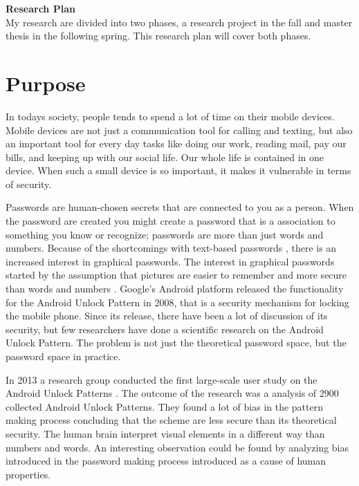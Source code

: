 
{\bf \Huge Research Plan} \\[0.5cm]

  My research are divided into two phases, a research project in the fall and master thesis in the following spring. This research plan will cover both phases.

  \section*{Purpose}


  In todays society, people tends to spend a lot of time on their mobile devices. Mobile devices are not just a communication tool for calling and texting, but also an important tool for every day tasks like doing our work, reading mail, pay our bills, and keeping up with our social life. Our whole life is contained in one device. When such a small device is so important, it makes it vulnerable in terms of security.

  Passwords are human-chosen secrets that are connected to you as a person. When the password are created you might create a password that is a association to something you know or recognize; passwords are more than just words and numbers. Because of the shortcomings with text-based passwords \cite{UnixPasswords}, there is an increased interest in graphical passwords. The interest in graphical passwords started by the assumption that pictures are easier to remember and more secure than words and numbers \cite{DeAngeli}. Google's Android platform released the functionality for the Android Unlock Pattern in 2008, that is a security mechanism for locking the mobile phone. Since its release, there have been a lot of discussion of its security, but few researchers have done a scientific research on the Android Unlock Pattern. The problem is not just the theoretical password space, but the password space in practice. 

  In 2013 a research group conducted the first large-scale user study on the Android Unlock Patterns \cite{Uellenbeck}. The outcome of the research was a analysis of 2900 collected Android Unlock Patterns. They found a lot of bias in the pattern making process concluding that the scheme are less secure than its theoretical security. The human brain interpret visual elements in a different way than numbers and words. An interesting observation could be found by analyzing bias introduced in the password making process introduced as a cause of human properties. 


